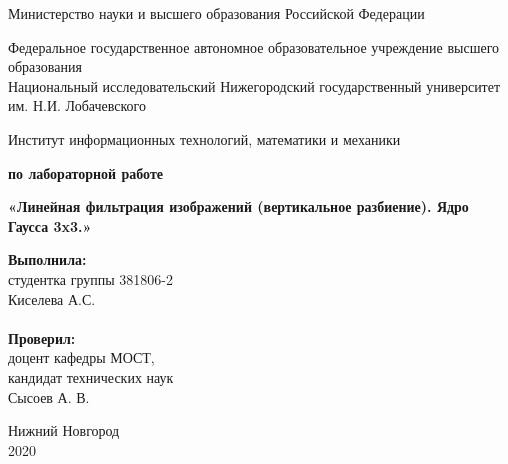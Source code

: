 \documentclass{report}
\begin{document}
\begin{titlepage}

\begin{center}
Министерство науки и высшего образования Российской Федерации
\end{center}

\begin{center}
Федеральное государственное автономное образовательное учреждение высшего образования \\
Национальный исследовательский Нижегородский государственный университет им. Н.И. Лобачевского
\end{center}

\begin{center}
Институт информационных технологий, математики и механики
\end{center}

\vspace{4em}

\begin{center}
\textbf{ по лабораторной работе} \\
\end{center}
\begin{center}
\textbf{\Large«Линейная фильтрация изображений (вертикальное разбиение). Ядро Гаусса 3x3.»} \\
\end{center}

\vspace{4em}

\newbox{\lbox}
\newlength{\maxl}
\setlength{\maxl}{\wd\lbox}
\hfill\parbox{7cm}{
\hspace*{5cm}\hspace*{-5cm}\textbf{Выполнила:} \\ студентка группы 381806-2 \\ Киселева А.С.\\
\\
\hspace*{5cm}\hspace*{-5cm}\textbf{Проверил:}\\ доцент кафедры МОСТ, \\ кандидат технических наук \\ Сысоев А. В.\\
}
\vspace{\fill}

\begin{center} Нижний Новгород \\ 2020 \end{center}

\end{titlepage}
\end{document}
